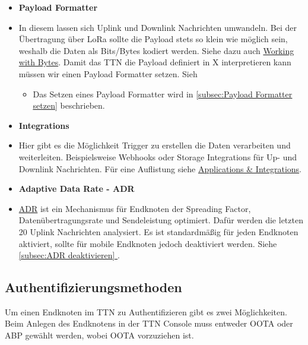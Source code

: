 \documentclass[12pt]{article}
\newcommand*{\fullref}[1]{\hyperref[{#1}]{\ref{#1} \nameref{#1}}}   %
\begin{document}
      \begin{itemize} %
        \item \textbf{Payload Formatter}
        \item[] In diesem lassen sich Uplink und Downlink Nachrichten umwandeln.
          Bei der Übertragung über LoRa sollte die Payload stets so klein wie möglich sein, weshalb die Daten als Bits/Bytes kodiert werden.
          Siehe dazu auch \href{https://www.thethingsnetwork.org/docs/devices/bytes/}{Working with Bytes}.
          Damit das TTN die Payload definiert in X interpretieren kann müssen wir einen Payload Formatter setzen. Sieh %
        \begin{itemize}
          \item Das Setzen eines Payload Formatter wird in \underline{\ref{subsec:Payload Formatter setzen}} beschrieben.
        \end{itemize}
        \item \textbf{Integrations}
        \item[] Hier gibt es die Möglichkeit Trigger zu erstellen die Daten verarbeiten und weiterleiten.
          Beispielsweise Webhooks oder Storage Integrations für Up- und Downlink Nachrichten.
          Für eine Auflistung siehe \href{https://www.thethingsnetwork.org/docs/applications-and-integrations/}{Applications \& Integrations}.
        \item \textbf{Adaptive Data Rate - ADR}
        \item[] \href{https://www.thethingsnetwork.org/docs/lorawan/adaptive-data-rate/}{ADR} ist ein Mechanismus für Endknoten
        der Spreading Factor, Datenübertragungsrate und Sendeleistung optimiert. Dafür werden die letzten 20 Uplink Nachrichten analysiert.
        Es ist standardmäßig für jeden Endknoten aktiviert, sollte für mobile Endknoten jedoch deaktiviert werden. Siehe \underline{\fullref{subsec:ADR deaktivieren}}.
      \end{itemize}



    \subsection{Authentifizierungsmethoden} \label{subsec:Authentifizierungsmethoden}
      Um einen Endknoten im TTN zu Authentifizieren gibt es zwei Möglichkeiten. Beim Anlegen des Endknotens in der TTN Console muss entweder
      OOTA oder ABP gewählt werden, wobei OOTA vorzuziehen ist.
\end{document}
